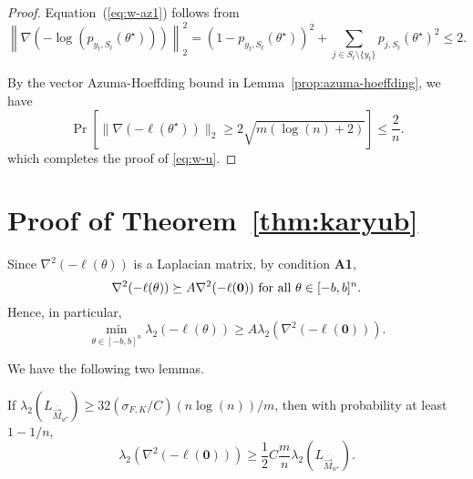 \begin{proof}
Equation~(\ref{eq:w-az1}) follows from
$$
\left\|\nabla (-\log(p_{y_t,S_t}(\theta^\star)))\right\|_2^2 = (1-p_{y_t,S_t}(\theta^\star))^2 + \sum_{j\in S_t\setminus \{y_t\}} p_{j,S_t}(\theta^\star)^2 \leq 2.
$$

By the vector Azuma-Hoeffding bound in Lemma~\ref{prop:azuma-hoeffding}, we have
$$
\Pr[\|\nabla(-\ell(\theta^\star))\|_2\geq 2\sqrt{m(\log(n)+2)}]  \leq \frac{2}{n}.
$$
which completes the proof of \eqref{eq:w-u}.
\end{proof}

\section{Proof of Theorem~\ref{thm:karyub}} \label{sec:proof-karyub}

Since $\nabla^2 (-\ell (\theta))$ is a Laplacian matrix, by condition {\bf A1}, 
$$
\nabla^2(-\ell (\theta)) \succeq A\nabla^2(-\ell ({\bm 0})) \hbox{ for all } \theta\in [-b,b]^n.
$$
Hence, in particular, 
\begin{equation}
\min_{\theta \in [-b,b]^n}\lambda_2(-\ell (\theta)) \geq A\lambda_2(\nabla^2(-\ell ({\bm 0}))).
\label{eq:semi}
\end{equation}

We have the following two lemmas.


\begin{lemma} If $\lambda_2(L_{\overline{\vec{M}}_{w^\star}}) \ge 32 (\sigma_{F,K}/C) (n\log(n))/m$, then with probability at least $1-1/n$,
$$
\lambda_2(\nabla^2(-\ell ({\bm 0}))) \ge \frac{1}{2}C \frac{m}{n} \lambda_2(L_{\overline{\vec{M}}_{w^\star}}).
$$
\label{lem:khessi}
\end{lemma}

